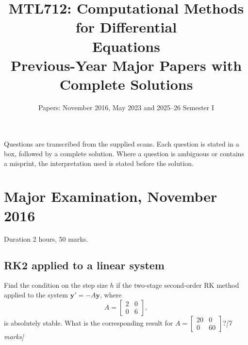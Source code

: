 \documentclass[11pt,a4paper]{article}
\title{\textbf{MTL712: Computational Methods for Differential\\Equations}\\[6pt]
\large Previous-Year Major Papers with Complete Solutions}
\author{\normalsize Papers: November 2016, May 2023 and 2025--26 Semester I}
\date{}
\newcommand{\mk}[1]{\hfill\textit{[#1 marks]}}
\begin{document}
\maketitle
\thispagestyle{plain}

Questions are transcribed from the supplied scans.  Each question is
stated in a box, followed by a complete solution.  Where a question is
ambiguous or contains a misprint, the interpretation used is stated
before the solution.

{\linespread{1.0}\selectfont\setlength{\parskip}{0pt}\tableofcontents}
\clearpage

\section{Major Examination, November 2016}

Duration 2 hours, 50 marks.

\subsection{RK2 applied to a linear system}

\begin{qbox}
Find the condition on the step size \(h\) if the two-stage
second-order RK method applied to the system \(\mathbf y'=-A\mathbf y\),
where
\[
  A=\begin{bmatrix}2&0\\0&6\end{bmatrix},
\]
is absolutely stable.  What is the corresponding result for
\(A=\begin{bmatrix}20&0\\0&60\end{bmatrix}\)?\mk{7}
\end{qbox}
\end{document}
